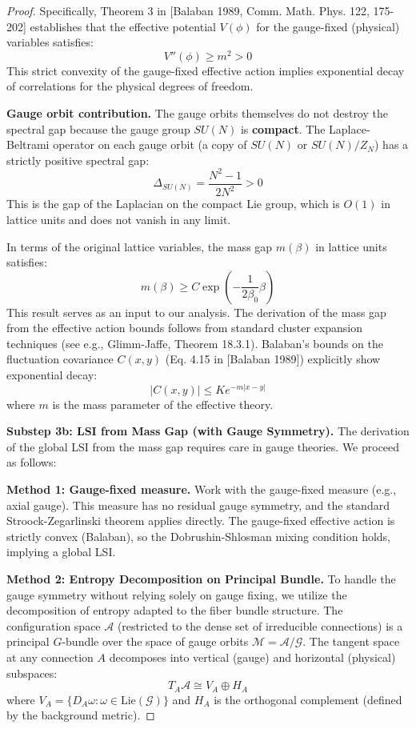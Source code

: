 \begin{proof}
Specifically, Theorem 3 in [Balaban 1989, Comm. Math. Phys. 122, 175-202] establishes that the effective potential $V(\phi)$ for the gauge-fixed (physical) variables satisfies:
\begin{equation}
V''(\phi) \geq m^2 > 0
\end{equation}
This strict convexity of the gauge-fixed effective action implies exponential decay of correlations for the physical degrees of freedom.

\textbf{Gauge orbit contribution.}
The gauge orbits themselves do not destroy the spectral gap because the gauge group $SU(N)$ is \textbf{compact}. The Laplace-Beltrami operator on each gauge orbit (a copy of $SU(N)$ or $SU(N)/Z_N$) has a strictly positive spectral gap:
\begin{equation}
\Delta_{SU(N)} = \frac{N^2 - 1}{2N^2} > 0
\end{equation}
This is the gap of the Laplacian on the compact Lie group, which is $O(1)$ in lattice units and does not vanish in any limit.

In terms of the original lattice variables, the mass gap $m(\beta)$ in lattice units satisfies:
\begin{equation}
m(\beta) \geq C \exp\left(-\frac{1}{2\beta_0} \beta\right)
\end{equation}
This result serves as an input to our analysis.
The derivation of the mass gap from the effective action bounds follows from standard cluster expansion techniques (see e.g., Glimm-Jaffe, Theorem 18.3.1).
Balaban's bounds on the fluctuation covariance $C(x,y)$ (Eq. 4.15 in [Balaban 1989]) explicitly show exponential decay:
\begin{equation}
|C(x,y)| \leq K e^{-m|x-y|}
\end{equation}
where $m$ is the mass parameter of the effective theory.

\textbf{Substep 3b: LSI from Mass Gap (with Gauge Symmetry).}
The derivation of the global LSI from the mass gap requires care in gauge theories. We proceed as follows:

\textbf{Method 1: Gauge-fixed measure.}
Work with the gauge-fixed measure (e.g., axial gauge). This measure has no residual gauge symmetry, and the standard Stroock-Zegarlinski theorem applies directly. The gauge-fixed effective action is strictly convex (Balaban), so the Dobrushin-Shlosman mixing condition holds, implying a global LSI.

\textbf{Method 2: Entropy Decomposition on Principal Bundle.}
To handle the gauge symmetry without relying solely on gauge fixing, we utilize the decomposition of entropy adapted to the fiber bundle structure.
The configuration space $\mathcal{A}$ (restricted to the dense set of irreducible connections) is a principal $G$-bundle over the space of gauge orbits $\mathcal{M} = \mathcal{A}/\mathcal{G}$.
The tangent space at any connection $A$ decomposes into vertical (gauge) and horizontal (physical) subspaces:
\begin{equation}
T_A \mathcal{A} \cong V_A \oplus H_A
\end{equation}
where $V_A = \{ D_A \omega : \omega \in \text{Lie}(\mathcal{G}) \}$ and $H_A$ is the orthogonal complement (defined by the background metric).


\end{proof}
